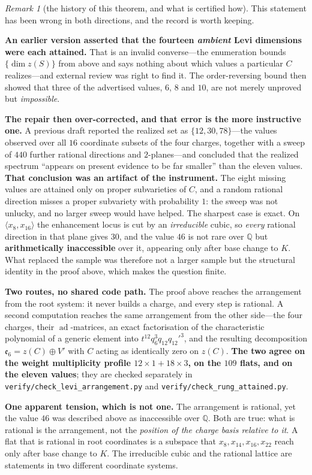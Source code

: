 \documentclass[11pt,reqno]{amsart}
\theoremstyle{plain}
\theoremstyle{definition}
\theoremstyle{remark}
\newtheorem{remark}[theorem]{Remark}
\newcommand{\Q}{\mathbb{Q}}
\newcommand{\ee}{\mathfrak{e}}
\newcommand{\ad}{\operatorname{ad}}
\newcommand{\fn}[1]{\texttt{\small #1}}
\begin{document}
\begin{remark}[the history of this theorem, and what is certified how]\label{rem:spectrumscope}
This statement has been wrong in both directions, and the record is worth keeping.

\textbf{An earlier version asserted that the fourteen \emph{ambient} Levi dimensions were
each attained.} That is an invalid converse---the enumeration bounds $\{\dim z(S)\}$ from
above and says nothing about which values a particular $C$ realizes---and external review
was right to find it. The order-reversing bound then showed that three of the advertised
values, $6$, $8$ and $10$, are not merely unproved but \emph{impossible}.

\textbf{The repair then over-corrected, and that error is the more instructive one.} A
previous draft reported the realized set as $\{12,30,78\}$---the values observed over all
$16$ coordinate subsets of the four charges, together with a sweep of $440$ further
rational directions and $2$-planes---and concluded that the realized spectrum ``appears on
present evidence to be far smaller'' than the eleven values. \textbf{That conclusion was an
artifact of the instrument.} The eight missing values are attained only on proper
subvarieties of $C$, and a random rational direction misses a proper subvariety with
probability $1$: the sweep was not unlucky, and no larger sweep would have helped. The
sharpest case is exact. On $\langle x_8,x_{16}\rangle$ the enhancement locus is cut by an
\emph{irreducible} cubic, so \emph{every} rational direction in that plane gives $30$, and
the value $46$ is not rare over $\Q$ but \textbf{arithmetically inaccessible} over it,
appearing only after base change to $K$. What replaced the sample was therefore not a
larger sample but the structural identity in the proof above, which makes the question
finite.

\textbf{Two routes, no shared code path.} The proof above reaches the arrangement from the
root system: it never builds a charge, and every step is rational. A second computation
reaches the same arrangement from the other side---the four charges, their
$\ad$-matrices, an exact factorisation of the characteristic polynomial of a generic
element into $t^{12}q_6^{3}q_{12}q_{12}'^{3}$, and the resulting decomposition
$\ee_6=z(C)\oplus V'$ with $C$ acting as identically zero on $z(C)$. \textbf{The two agree
on the weight multiplicity profile $12\times1+18\times3$, on the $109$ flats, and on the
eleven values}; they are checked separately in
\fn{verify/check\_\allowbreak levi\_\allowbreak arrangement.py} and
\fn{verify/check\_\allowbreak rung\_\allowbreak attained.py}.

\textbf{One apparent tension, which is not one.} The arrangement is rational, yet the value
$46$ was described above as inaccessible over $\Q$. Both are true: what is rational is the
arrangement, not the \emph{position of the charge basis relative to it}. A flat that is
rational in root coordinates is a subspace that $x_8,x_{14},x_{16},x_{22}$ reach only after
base change to $K$. The irreducible cubic and the rational lattice are statements in two
different coordinate systems.
\end{remark}
\end{document}
